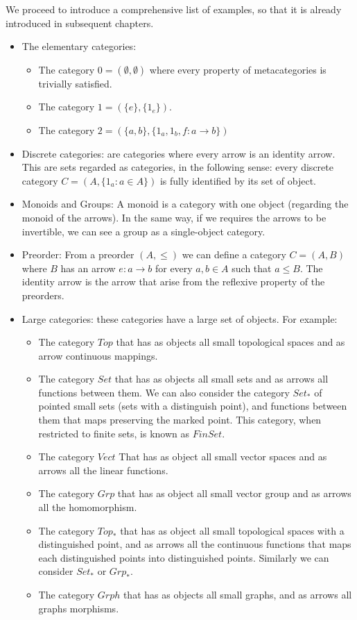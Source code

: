 We proceed to introduce a comprehensive list of examples, so that it is already introduced in subsequent chapters. 
\begin{example}

  \begin{itemize}  \ 
  \item The elementary categories:
    \begin{itemize}
    \item The category $0 = ( \emptyset, \emptyset)$ where every property of metacategories is trivially satisfied.
    \item The category $1 = (\{e\},\{1_e\})$.
    \item The category $2 = (\{a,b\},\{1_a,1_b,f:a\to b\})$\label{2-category}
    \end{itemize}

  \item Discrete categories: are categories where every arrow is an identity arrow. This are sets regarded as categories, in the following sense: every discrete category $C=(A, \{1_a : a \in A\})$ is fully identified by its set of object.  
  \item Monoids and Groups: A monoid is a category with one object (regarding the monoid of the arrows). In the same way, if we requires the arrows to be invertible, we can see a group as a single-object category. 
  \item Preorder: From a preorder $(A, \le)$ we can define a category $C = (A, B)$ where $B$ has an arrow $e: a \to b$ for every $a,b\in A$ such that $a \le B$. The identity arrow is the arrow that arise from the reflexive property of the preorders. 

  \item Large categories: these categories have a large set of objects. For example:
    \begin{itemize}
    \item The category $Top$ that has as objects all small topological spaces and as arrow continuous mappings.
    \item The category $Set$ that has as objects all small sets and as arrows all functions between them. We can also consider the category $Set_*$ of pointed small sets (sets with a distinguish point), and functions between them that maps preserving the marked point. This category, when restricted to finite sets, is known as $FinSet$.
    \item The category $Vect$ That has as object all small vector spaces and as arrows all the linear functions.
    \item The category $Grp$ that has as object all small vector group and as arrows all the homomorphism.
    \item The category $Top_*$ that has as object all small topological spaces with a distinguished point, and as arrows all the continuous functions that maps each distinguished points into distinguished points. Similarly we can consider $Set_*$ or $Grp_*$.
    \item The category $Grph$ that has as objects all small graphs, and as arrows all graphs morphisms.
    \end{itemize}


\end{itemize}
\end{example}
